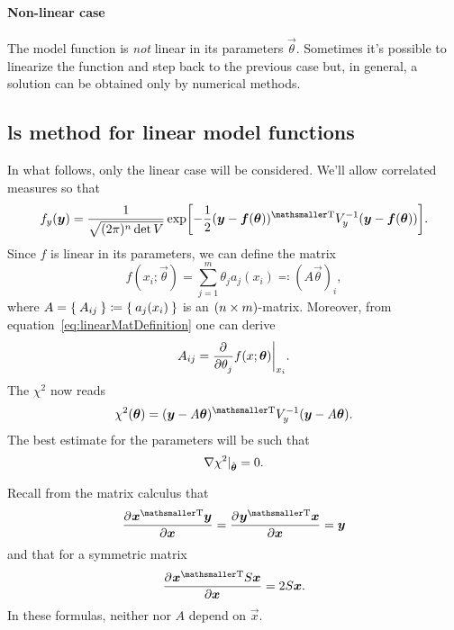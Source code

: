 \paragraph{Non-linear case}
The model function is \emph{not} linear in its parameters $\vec{\theta}$.
Sometimes it's possible to linearize the function and step back to the previous case but, in general, a solution can be obtained only by numerical methods.

\subsection{\acs{ls} method for linear model functions}

In what follows, only the linear case will be considered.
We'll allow correlated measures so that
\begin{equation}
	f_y (\vec{y}) = \frac{1}{\sqrt{(2\pi)^n\det V}}\exp
	\qp[\bigg]{%
		-\frac{1}{2}\transpose{(\vec{y} - \vec{f}(\vec{\theta}))}V_y^{-1}(\vec{y} - \vec{f}(\vec{\theta}))
	}.
\end{equation}
Since $f$ is linear in its parameters, we can define the matrix
\begin{equation}\label{eq:linearMatDefinition}
	f(x_i;\vec{\theta}) = \sum_{j=1}^m \theta_ja_j(x_i) \eqqcolon (A\vec{\theta})_i,
\end{equation}
where $A = \Set{A_{ij}} \coloneqq \Set{a_j(x_i)}$ is an $(n\times m)$-matrix.
Moreover, from equation~\eqref{eq:linearMatDefinition} one can derive
\begin{equation}
	A_{ij} = \pderiv{}{\theta_j}f(x;\vec{\theta})\bigg\rvert_{%
	x_i}.
\end{equation}
The $\chi^2$ now reads
\begin{equation}\label{eq:ChiSquareFunctionLinear}
	\chi^2(\vec{\theta}) = \transpose{(\vec{y} - A\vec{\theta})}V_y^{-1}(\vec{y} - A\vec{\theta}).
\end{equation}
The best estimate for the parameters will be such that
\begin{equation}
	\mathop{}\!\nabla \chi^2\rvert_{\hat{\bm{{\theta}}}} = 0.
\end{equation}


Recall from the matrix calculus that
\begin{equation}
	\pderiv{\transpose{\vec{x}}\vec{y}}{\vec{x}} = 
	\pderiv{\transpose{\vec{y}}\vec{x}}{\vec{x}} = \vec{y}
\end{equation}
and that for a symmetric matrix
\begin{equation}
	\pderiv{\transpose{\vec{x}}S\vec{x}}{\vec{x}} = 2S\vec{x}.
\end{equation}
In these formulas, neither  nor $A$ depend on $\vec{x}$.


